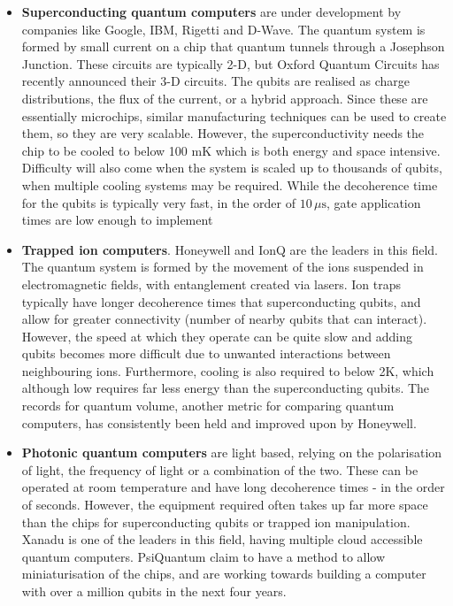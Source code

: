 \documentclass{article}
\theoremstyle{definition}
\begin{document}
\begin{itemize}
    \item \textbf{Superconducting quantum computers} are under development by companies like Google, IBM, Rigetti and D-Wave. The quantum system is formed by small current on a chip that quantum tunnels through a Josephson Junction. These circuits are typically 2-D, but Oxford Quantum Circuits has recently announced their 3-D circuits. The qubits are realised as charge distributions, the flux of the current, or a hybrid approach. Since these are essentially microchips, similar manufacturing techniques can be used to create them, so they are very scalable. However, the superconductivity needs the chip to be cooled to below 100 mK which is both energy and space intensive. Difficulty will also come when the system is scaled up to thousands of qubits, when multiple cooling systems may be required. While the decoherence time for the qubits is typically very fast, in the order of $10 \, \mu \text{s}$, gate application times are low enough to implement 
    \item \textbf{Trapped ion computers}. Honeywell and IonQ are the leaders in this field. The quantum system is formed by the movement of the ions suspended in electromagnetic fields, with entanglement created via lasers. Ion traps typically have longer decoherence times that superconducting qubits, and allow for greater connectivity (number of nearby qubits that can interact). However, the speed at which they operate can be quite slow and adding qubits becomes more difficult due to unwanted interactions between neighbouring ions. Furthermore, cooling is also required to below 2K, which although low requires far less energy than the superconducting qubits. The records for quantum volume, another metric for comparing quantum computers, has consistently been held and improved upon by Honeywell.
    \item \textbf{Photonic quantum computers} are light based, relying on the polarisation of light, the frequency of light or a combination of the two. These can be operated at room temperature and have long decoherence times - in the order of seconds. However, the equipment required often takes up far more space than the chips for superconducting qubits or trapped ion manipulation. Xanadu is one of the leaders in this field, having multiple cloud accessible quantum computers. PsiQuantum claim to have a method to allow miniaturisation of the chips, and are working towards building a computer with over a million qubits in the next four years. 

\end{itemize}
\end{document}
